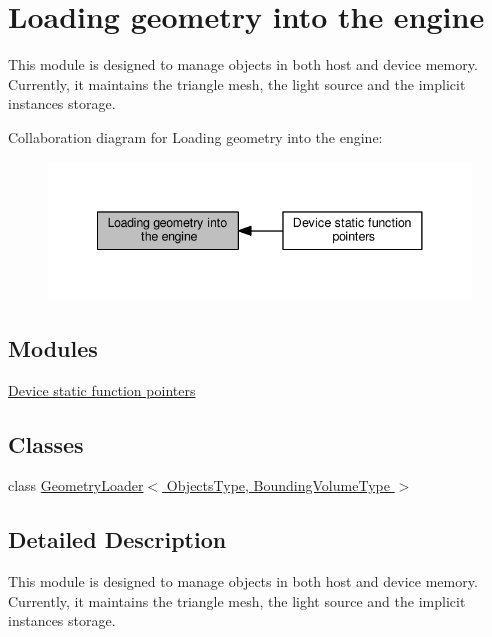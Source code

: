\hypertarget{group__geometry__loading}{}\section{Loading geometry into the engine}
\label{group__geometry__loading}


This module is designed to manage objects in both host and device memory. Currently, it maintains the triangle mesh, the light source and the implicit instances storage.  


Collaboration diagram for Loading geometry into the engine\+:\nopagebreak
\begin{figure}[H]
\begin{center}
\leavevmode
\includegraphics[width=341pt]{group__geometry__loading}
\end{center}
\end{figure}
\subsection*{Modules}
\begin{DoxyCompactItemize}
\item 
\hyperlink{group__device__pointers}{Device static function pointers}
\end{DoxyCompactItemize}
\subsection*{Classes}
\begin{DoxyCompactItemize}
\item 
class \hyperlink{class_geometry_loader}{Geometry\+Loader$<$ Objects\+Type, Bounding\+Volume\+Type $>$}
\end{DoxyCompactItemize}


\subsection{Detailed Description}
This module is designed to manage objects in both host and device memory. Currently, it maintains the triangle mesh, the light source and the implicit instances storage. 

